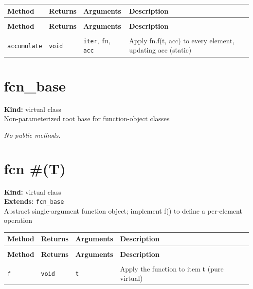 \documentclass[11pt,letterpaper]{report}
\begin{document}
\begin{xltabular}{\linewidth}{>{\small}p{1.35in} >{\small}p{1.25in} >{\small}p{0.95in} >{\small}X}
\toprule
\textbf{Method} & \textbf{Returns} & \textbf{Arguments} & \textbf{Description} \\
\midrule
\endfirsthead
{} \\
\midrule
\textbf{Method} & \textbf{Returns} & \textbf{Arguments} & \textbf{Description} \\
\midrule
\endhead
\midrule
{} \\
\endfoot
\bottomrule
\endlastfoot
\texttt{accumulate} & \texttt{void} & \texttt{iter}, \texttt{fn}, \texttt{acc} & Apply fn.f(t, acc) to every element, updating acc (static) \\
\end{xltabular}

\section{fcn\_base}
\label{cls:fcnbase}

\noindent\textbf{Kind:} virtual class\\
\noindent Non-parameterized root base for function-object classes

\noindent\textit{No public methods.}


\section{fcn \#(T)}
\label{cls:fcnT}

\noindent\textbf{Kind:} virtual class\\
\noindent\textbf{Extends:} \texttt{fcn\_base}\\
\noindent Abstract single-argument function object; implement f() to define a per-element operation

\begin{xltabular}{\linewidth}{>{\small}p{1.35in} >{\small}p{1.25in} >{\small}p{0.95in} >{\small}X}
\toprule
\textbf{Method} & \textbf{Returns} & \textbf{Arguments} & \textbf{Description} \\
\midrule
\endfirsthead
{} \\
\midrule
\textbf{Method} & \textbf{Returns} & \textbf{Arguments} & \textbf{Description} \\
\midrule
\endhead
\midrule
{} \\
\endfoot
\bottomrule
\endlastfoot
\texttt{f} & \texttt{void} & \texttt{t} & Apply the function to item t (pure virtual) \\
\end{xltabular}
\end{document}
